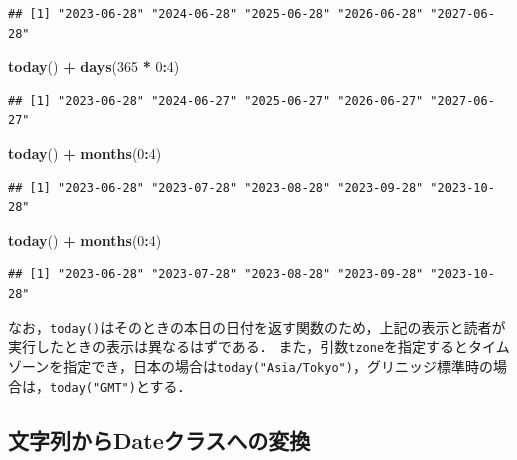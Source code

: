 \documentclass[
]{article}
\newenvironment{Shaded}{\begin{snugshade}}{\end{snugshade}}
\newcommand{\DecValTok}[1]{\textcolor[rgb]{0.00,0.00,0.81}{#1}}
\newcommand{\FunctionTok}[1]{\textcolor[rgb]{0.13,0.29,0.53}{\textbf{#1}}}
\newcommand{\NormalTok}[1]{#1}
\newcommand{\SpecialCharTok}[1]{\textcolor[rgb]{0.81,0.36,0.00}{\textbf{#1}}}
\begin{document}
\begin{verbatim}
## [1] "2023-06-28" "2024-06-28" "2025-06-28" "2026-06-28" "2027-06-28"
\end{verbatim}

\begin{Shaded}
\begin{Highlighting}[]
\FunctionTok{today}\NormalTok{() }\SpecialCharTok{+} \FunctionTok{days}\NormalTok{(}\DecValTok{365} \SpecialCharTok{*} \DecValTok{0}\SpecialCharTok{:}\DecValTok{4}\NormalTok{)}
\end{Highlighting}
\end{Shaded}

\begin{verbatim}
## [1] "2023-06-28" "2024-06-27" "2025-06-27" "2026-06-27" "2027-06-27"
\end{verbatim}

\begin{Shaded}
\begin{Highlighting}[]
\FunctionTok{today}\NormalTok{() }\SpecialCharTok{+} \FunctionTok{months}\NormalTok{(}\DecValTok{0}\SpecialCharTok{:}\DecValTok{4}\NormalTok{)}
\end{Highlighting}
\end{Shaded}

\begin{verbatim}
## [1] "2023-06-28" "2023-07-28" "2023-08-28" "2023-09-28" "2023-10-28"
\end{verbatim}

\begin{Shaded}
\begin{Highlighting}[]
\FunctionTok{today}\NormalTok{() }\SpecialCharTok{+} \FunctionTok{months}\NormalTok{(}\DecValTok{0}\SpecialCharTok{:}\DecValTok{4}\NormalTok{)}
\end{Highlighting}
\end{Shaded}

\begin{verbatim}
## [1] "2023-06-28" "2023-07-28" "2023-08-28" "2023-09-28" "2023-10-28"
\end{verbatim}

なお，\texttt{today()}はそのときの本日の日付を返す関数のため，上記の表示と読者が実行したときの表示は異なるはずである．
また，引数\texttt{tzone}を指定するとタイムゾーンを指定でき，日本の場合は\texttt{today("Asia/Tokyo")}，グリニッジ標準時の場合は，\texttt{today("GMT")}とする．

\hypertarget{ux6587ux5b57ux5217ux304bux3089dateux30afux30e9ux30b9ux3078ux306eux5909ux63db}{%
\subsection{文字列からDateクラスへの変換}\label{ux6587ux5b57ux5217ux304bux3089dateux30afux30e9ux30b9ux3078ux306eux5909ux63db}}
\end{document}
